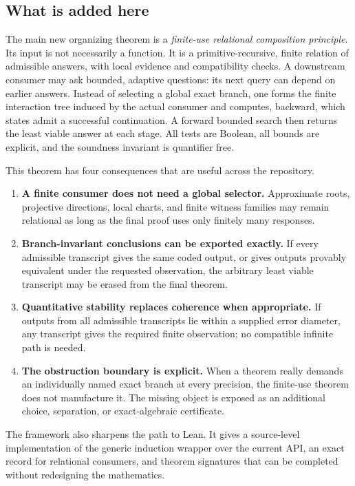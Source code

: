 \subsection{What is added here}

The main new organizing theorem is a \emph{finite-use relational composition principle}.  Its input is not necessarily a function.  It is a primitive-recursive, finite relation of admissible answers, with local evidence and compatibility checks.  A downstream consumer may ask bounded, adaptive questions: its next query can depend on earlier answers.  Instead of selecting a global exact branch, one forms the finite interaction tree induced by the actual consumer and computes, backward, which states admit a successful continuation.  A forward bounded search then returns the least viable answer at each stage.  All tests are Boolean, all bounds are explicit, and the soundness invariant is quantifier free.

This theorem has four consequences that are useful across the repository.

\begin{enumerate}[label=\arabic*.]
\item \textbf{A finite consumer does not need a global selector.}  Approximate roots, projective directions, local charts, and finite witness families may remain relational as long as the final proof uses only finitely many responses.
\item \textbf{Branch-invariant conclusions can be exported exactly.}  If every admissible transcript gives the same coded output, or gives outputs provably equivalent under the requested observation, the arbitrary least viable transcript may be erased from the final theorem.
\item \textbf{Quantitative stability replaces coherence when appropriate.}  If outputs from all admissible transcripts lie within a supplied error diameter, any transcript gives the required finite observation; no compatible infinite path is needed.
\item \textbf{The obstruction boundary is explicit.}  When a theorem really demands an individually named exact branch at every precision, the finite-use theorem does not manufacture it.  The missing object is exposed as an additional choice, separation, or exact-algebraic certificate.
\end{enumerate}

The framework also sharpens the path to Lean.  It gives a source-level implementation of the generic induction wrapper over the current  API, an exact record for relational consumers, and theorem signatures that can be completed without redesigning the mathematics.

